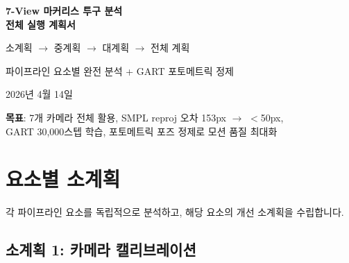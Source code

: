 \documentclass[11pt, a4paper]{report}
\begin{document}
\begin{titlepage}
\centering
\vspace*{2cm}
{\Huge\bfseries\color{defblue} 7-View 마커리스 투구 분석\\[0.3cm] 전체 실행 계획서}

\vspace{1cm}
{\LARGE\color{defblue!70!black} 소계획 $\to$ 중계획 $\to$ 대계획 $\to$ 전체 계획}

\vspace{2cm}
{\large 파이프라인 요소별 완전 분석 + GART 포토메트릭 정제}

\vspace{1cm}
{\large 2026년 4월 14일}

\vspace{3cm}
\begin{tcolorbox}[colback=lightblue, colframe=defblue, width=0.85\textwidth]
\textbf{목표}: 7개 카메라 전체 활용, SMPL reproj 오차 153px $\to$ $<$50px,\\
GART 30,000스텝 학습, 포토메트릭 포즈 정제로 모션 품질 최대화
\end{tcolorbox}
\end{titlepage}

\tableofcontents
\newpage

\chapter{요소별 소계획}

각 파이프라인 요소를 독립적으로 분석하고, 해당 요소의 개선 소계획을 수립합니다.

\section{소계획 1: 카메라 캘리브레이션}
\label{sec:sp1}
\end{document}
